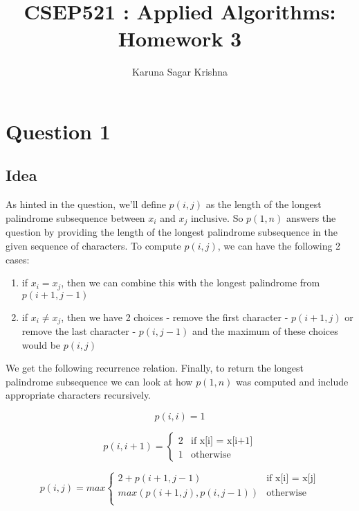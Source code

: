 \documentclass{article}
\title{CSEP521 : Applied Algorithms: Homework 3}
\author{Karuna Sagar Krishna}
\begin{document}
    \maketitle

    \section*{Question 1}

    \subsection*{Idea}
    As hinted in the question, we'll define $p(i, j)$ as the length of the longest palindrome subsequence between $x_i$ and $x_j$ inclusive. So $p(1, n)$ answers the question by providing the length of the longest palindrome subsequence in the given sequence of characters. To compute $p(i, j)$, we can have the following 2 cases:

    \begin{enumerate}
        \item if $x_i = x_j$, then we can combine this with the longest palindrome from $p(i+1, j-1)$
        \item if $x_i \ne x_j$, then we have 2 choices - remove the first character - $p(i+1, j)$ or remove the last character - $p(i, j-1)$ and the maximum of these choices would be $p(i, j)$
    \end{enumerate}

    We get the following recurrence relation. Finally, to return the longest palindrome subsequence we can look at how $p(1, n)$ was computed and include appropriate characters recursively.

    \begin{equation*}
        p(i, i) = 1
    \end{equation*}

    \begin{equation*}
        p(i, i+1) = 
        \begin{cases}
            2   & \text{if x[i] = x[i+1]} \\
            1   & \text{otherwise}
        \end{cases}
    \end{equation*}

    \begin{equation*}
        p(i, j) = max
        \begin{cases}
            2 + p(i+1, j-1)                 & \text{if x[i] = x[j]} \\
            max(p(i+1, j), p(i, j-1))       & \text{otherwise} \\
        \end{cases}
    \end{equation*}
    
\end{document}
